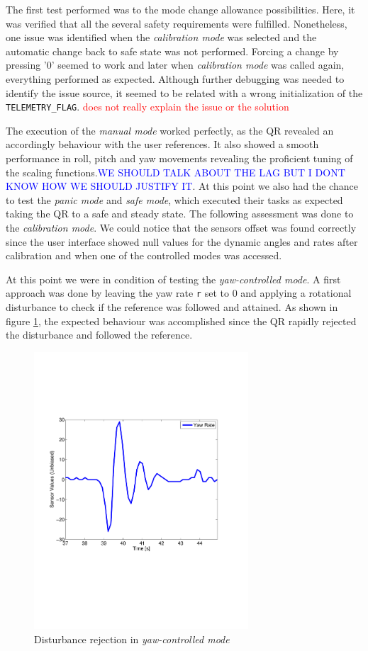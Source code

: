 \documentclass{article}
\newcommand\worries[1]{\textcolor{red}{#1}} %
\newcommand\todo[1]{\textcolor{blue}{#1}} %
\begin{document}
The first test performed was to the mode change allowance possibilities. Here, it was verified that all the several safety requirements were fulfilled. Nonetheless, one issue was identified when the \textit{calibration mode} was selected and the automatic change back to safe state was not performed. Forcing a change by pressing '$0$' seemed to work and later when \textit{calibration mode} was called again, everything performed as expected. Although further debugging was needed to identify the issue source, it seemed to be related with a wrong initialization of the \texttt{TELEMETRY\_FLAG}. \worries{does not really explain the issue or the solution}

The execution of the \textit{manual mode} worked perfectly, as the QR revealed an accordingly behaviour with the user references. It also showed a smooth performance in roll, pitch and yaw movements revealing the proficient tuning of the scaling functions.\todo{WE SHOULD TALK ABOUT THE LAG BUT I DONT KNOW HOW WE SHOULD JUSTIFY IT}. At this point we also had the chance to test the \textit{panic mode} and \textit{safe mode}, which executed their tasks as expected taking the QR to a safe and steady state. The following assessment was done to the \textit{calibration mode}. We could notice that the sensors offset was found correctly since the user interface showed null values for the dynamic angles and rates after calibration and when one of the controlled modes was accessed.

At this point we were in condition of testing the \textit{yaw-controlled mode}. A first approach was done by leaving the yaw rate \texttt{r} set to 0 and applying a rotational disturbance to check if the reference was followed and attained. As shown in figure \ref{fig:YawControl}, the expected behaviour was accomplished since the QR rapidly rejected the disturbance and followed the reference.

\begin{figure}[ht]
\centering
	\includegraphics[width=8cm]{Figures/YawControl.pdf}
	\caption{Disturbance rejection in \textit{yaw-controlled mode}}
	\label{fig:YawControl}
\end{figure}
\end{document}
